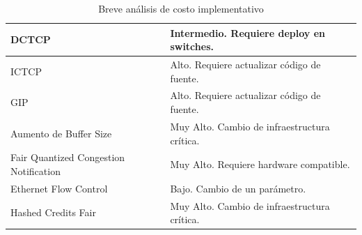 \documentclass[runningheads,a4paper]{llncs}
\begin{document}
\begin{table}[]
{\begin{tabular}{@{}ll@{}}
DCTCP \cite{Alizadeh_DCTCP_2010}                                  & Intermedio. Requiere deploy en switches.                          \\ \midrule
ICTCP \cite{Wu_ICTCP_2010}                                  & Alto. Requiere actualizar código de fuente.                       \\ \midrule
GIP \cite{Zhang_GIP_2013}                                    & Alto. Requiere actualizar código de fuente.                       \\ \midrule
Aumento de Buffer Size \cite{Phanishayee_Throughput_2008} \cite{Kulkarni_Probabilistic_2011}                 & Muy Alto. Cambio de infraestructura crítica.                      \\ \midrule
Fair Quantized Congestion Notification \cite{Zhang_QCN_2011} & Muy Alto. Requiere hardware compatible.                           \\ \midrule
Ethernet Flow Control \cite{Phanishayee_Throughput_2008}                  & Bajo. Cambio de un parámetro.                                     \\ \midrule
Hashed Credits Fair \cite{Shpiner_HCF_2010}                    & Muy Alto. Cambio de infraestructura crítica.                      \\ \bottomrule
\end{tabular}%
}
\caption{Breve análisis de costo implementativo}
\label{table:technical-cost}
\end{table}

\newpage

{}
\end{document}
